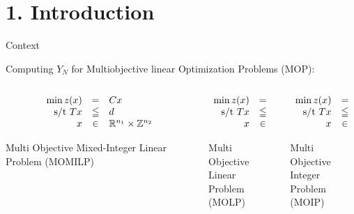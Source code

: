 \documentclass[10pt,xcolor=dvipsnames]{beamer}
\newcommand{\mR}{\mathbb{R}}
\newcommand{\mZ}{\mathbb{Z}}
\begin{document}
\section{1. Introduction}

\begin{frame}{Context}

\hspace{-3mm}Computing $Y_N$ for Multiobjective linear Optimization Problems (MOP):


\begin{columns}
\begin{column}{0.33\textwidth}
$$
\begin{array}{rcl}
\min z(x) & = & {C}x\\
\hbox{s/t } Tx & \leqq & d\\
x & \in & 
\mR^{n_1} \times \mZ^{n_2}
\notag
\end{array}
\vspace{2mm}
$$
\begin{center}
Multi Objective Mixed-Integer Linear Problem (MOMILP)
\end{center}
\end{column}
\begin{column}{0.33\textwidth}
$$
\begin{array}{rcl}
\min z(x) & = & {C}x\\
\hbox{s/t } Tx & \leqq & d\\
x & \in & 
\mR^{n_1}
\notag
\end{array}
\vspace{2mm}
$$
\begin{center}
Multi Objective\\ Linear \\Problem (MOLP)
\end{center}
\end{column}
\begin{column}{0.33\textwidth}
$$
\begin{array}{rcl}
\min z(x) & = & {C}x\\
\hbox{s/t } Tx & \leqq & d\\
x & \in & 
\mZ^{n_2}
\notag
\end{array}
\vspace{2mm}
$$
\begin{center}
Multi Objective\\ Integer \\Problem (MOIP)
\end{center}
\end{column}
\end{columns}
\vspace{2mm}


\end{frame}
\end{document}
